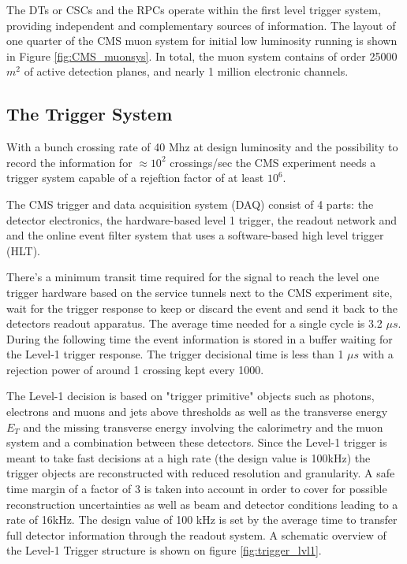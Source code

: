 The DTs or CSCs and the RPCs operate within the ﬁrst level trigger system, providing independent and complementary sources of information.
The layout of one quarter of the CMS muon system for initial low luminosity running is shown in Figure \ref{fig:CMS_muonsys}. In total, the muon system contains of order 25000 $m^{2}$ of active detection planes, and nearly 1 million electronic channels.

\clearpage

\subsection{The Trigger System}

With a bunch crossing rate of 40 Mhz at design luminosity and the possibility to record the information for $\approx 10^{2}$ crossings/sec the CMS experiment needs a trigger system capable of a rejeftion factor of at least $10^{6}$.

The CMS trigger and data acquisition system (DAQ) consist of 4 parts: the detector electronics, the hardware-based level 1 trigger, the readout network and and the online event filter system that uses a software-based high level trigger (HLT).

There's a minimum transit time required for the signal to reach the level one trigger hardware based on the service tunnels next to the CMS experiment site, wait for the trigger response to keep or discard the event and send it back to the detectors readout apparatus. The average time needed for a single cycle is 3.2 $\mu s$. During the following time the event information is stored in a buffer waiting for the Level-1 trigger response. The trigger decisional time is less than 1 $\mu s$ with a rejection power of around 1 crossing kept every 1000.

The Level-1 decision is based on "trigger primitive" objects such as photons, electrons and muons and jets above thresholds as well as the transverse energy $E_{T}$ and the missing transverse energy \met involving the calorimetry and the muon system and a combination between these detectors. Since the Level-1 trigger is meant to take fast decisions at a high rate (the design value is 100kHz) the trigger objects are reconstructed with reduced resolution and granularity. A safe time margin of a factor of 3 is taken into account in order to cover for possible reconstruction uncertainties as well as beam and detector conditions leading to a rate of 16kHz. The design value of 100 kHz is set by the average time to transfer full detector information through the readout system. A schematic overview of the Level-1 Trigger structure is shown on figure \ref{fig:trigger_lvl1}.


